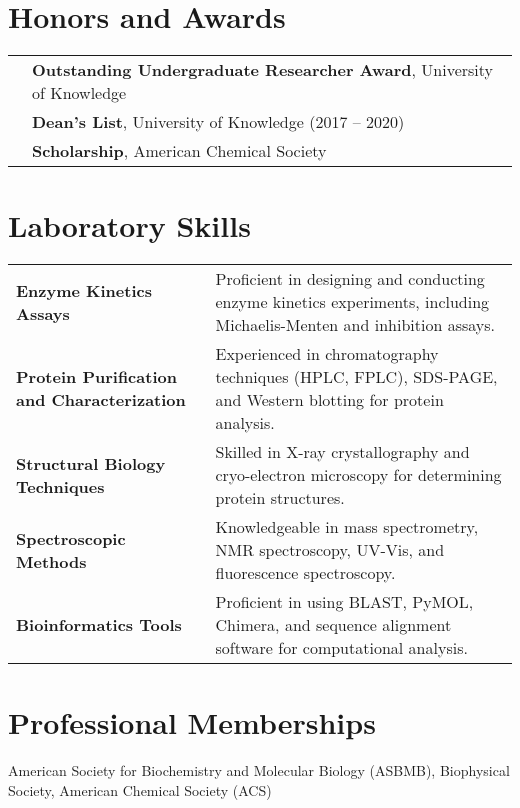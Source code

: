 \documentclass[a4paper,10pt]{article}
\begin{document}
\section{Honors and Awards}
\begin{tabularx}{\textwidth}{>{\raggedright\arraybackslash}p{1.5cm} X}
2020 & \textbf{Outstanding Undergraduate Researcher Award}, University of Knowledge \\
2019 & \textbf{Dean's List}, University of Knowledge (2017 -- 2020) \\
2018 & \textbf{Scholarship}, American Chemical Society \\
\end{tabularx}

\section{Laboratory Skills}
\begin{tabularx}{\textwidth}{>{\raggedright\arraybackslash}p{5cm} X}
\textbf{Enzyme Kinetics Assays} & Proficient in designing and conducting enzyme kinetics experiments, including Michaelis-Menten and inhibition assays. \\
\textbf{Protein Purification and Characterization} & Experienced in chromatography techniques (HPLC, FPLC), SDS-PAGE, and Western blotting for protein analysis. \\
\textbf{Structural Biology Techniques} & Skilled in X-ray crystallography and cryo-electron microscopy for determining protein structures. \\
\textbf{Spectroscopic Methods} & Knowledgeable in mass spectrometry, NMR spectroscopy, UV-Vis, and fluorescence spectroscopy. \\

\textbf{Bioinformatics Tools} & Proficient in using BLAST, PyMOL, Chimera, and sequence alignment software for computational analysis. \\
\end{tabularx}

\section{Professional Memberships}
American Society for Biochemistry and Molecular Biology (ASBMB), Biophysical Society, American Chemical Society (ACS)
\end{document}
